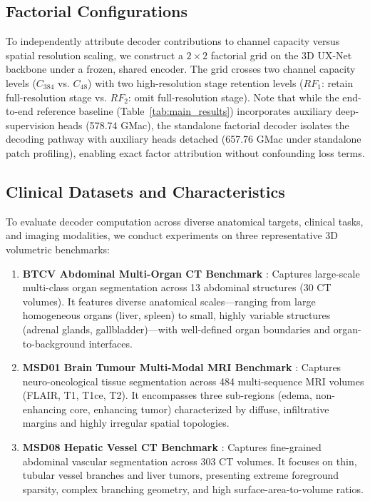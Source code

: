 \subsection{Factorial Configurations}
\label{sec:factorial_configs}

To independently attribute decoder contributions to channel capacity versus spatial resolution scaling, we construct a $2 \times 2$ factorial grid on the 3D UX-Net backbone under a frozen, shared encoder. The grid crosses two channel capacity levels ($C_{384}$ vs. $C_{48}$) with two high-resolution stage retention levels ($RF_1$: retain full-resolution stage vs. $RF_2$: omit full-resolution stage). Note that while the end-to-end reference baseline (Table~\ref{tab:main_results}) incorporates auxiliary deep-supervision heads (578.74 GMac), the standalone factorial decoder isolates the decoding pathway with auxiliary heads detached (657.76 GMac under standalone patch profiling), enabling exact factor attribution without confounding loss terms.

\subsection{Clinical Datasets and Characteristics}
\label{sec:datasets}

To evaluate decoder computation across diverse anatomical targets, clinical tasks, and imaging modalities, we conduct experiments on three representative 3D volumetric benchmarks:
\begin{enumerate}
    \item \textbf{BTCV Abdominal Multi-Organ CT Benchmark} \cite{landman2015btcv}: Captures large-scale multi-class organ segmentation across 13 abdominal structures (30 CT volumes). It features diverse anatomical scales---ranging from large homogeneous organs (liver, spleen) to small, highly variable structures (adrenal glands, gallbladder)---with well-defined organ boundaries and organ-to-background interfaces.
    \item \textbf{MSD01 Brain Tumour Multi-Modal MRI Benchmark} \cite{bakas2018identifying,simpson2019large}: Captures neuro-oncological tissue segmentation across 484 multi-sequence MRI volumes (FLAIR, T1, T1ce, T2). It encompasses three sub-regions (edema, non-enhancing core, enhancing tumor) characterized by diffuse, infiltrative margins and highly irregular spatial topologies.
    \item \textbf{MSD08 Hepatic Vessel CT Benchmark} \cite{simpson2019large}: Captures fine-grained abdominal vascular segmentation across 303 CT volumes. It focuses on thin, tubular vessel branches and liver tumors, presenting extreme foreground sparsity, complex branching geometry, and high surface-area-to-volume ratios.
\end{enumerate}

